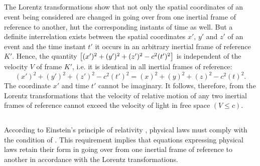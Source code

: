 


\subsection{}\label{5.3.3} The Lorentz transformations show that not only the spatial coordinates of an event being considered are changed in going over from one inertial frame of reference to another, hut the corresponding instants of time as well. But a definite interrela­tion exists between the spatial coordinates $x'$, $y'$ and $z'$ of an event and the time instant $t'$ it occurs in an arbitrary inertial frame of reference $K'$. Hence, the quantity $\qty[(x')^{2}+ (y')^{2} + (z')^{2}- c^{2}(t')^{2}]$ is independent of the velocity $V$ of frame $K'$, i.e. it is identical in all inertial frames of reference:
\begin{equation*}%
(x')^{2}+ (y')^{2} + (z')^{2}- c^{2}(t')^{2} = (x)^{2}+ (y)^{2} + (z)^{2}- c^{2}(t)^{2}.
\end{equation*}
The coordinate $x'$ and time $t'$ cannot be imaginary. It follows, therefore, from the Lorentz transformations that the velocity of relative motion of any two inertial frames of reference cannot exceed the velocity of light in free space $(V \leqslant c)$.

\subsection{}\label{5.3.4} According to Einstein's principle of relativity , physical laws must comply with the condition of . This requirement implies that equations expressing physical laws retain their form in going over from one inertial frame of reference to another in accord­ance with the Lorentz transformations.

